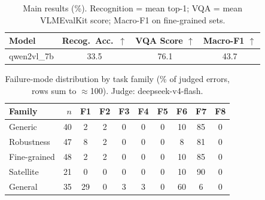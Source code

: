 \begin{table}[t]\centering
\caption{Main results (\%). Recognition = mean top-1; VQA = mean VLMEvalKit score; Macro-F1 on fine-grained sets.}\label{tab:main}
\begin{tabular}{lccc}\toprule
Model & Recog.\ Acc.\ $\uparrow$ & VQA Score $\uparrow$ & Macro-F1 $\uparrow$ \\\midrule
    qwen2vl_7b & 33.5 & 76.1 & 43.7 \\
\bottomrule\end{tabular}\end{table}

\begin{table}[t]\centering
\caption{Failure-mode distribution by task family (\% of judged errors, rows sum to $\approx$100). Judge: deepseek-v4-flash.}\label{tab:failure}
\begin{tabular}{lrcccccccc}\toprule
Family & $n$ & F1 & F2 & F3 & F4 & F5 & F6 & F7 & F8 \\\midrule
    Generic & 40 & 2 & 2 & 0 & 0 & 0 & 10 & 85 & 0 \\
    Robustness & 47 & 8 & 2 & 0 & 0 & 0 & 8 & 81 & 0 \\
    Fine-grained & 48 & 2 & 2 & 0 & 0 & 0 & 10 & 85 & 0 \\
    Satellite & 21 & 0 & 0 & 0 & 0 & 0 & 10 & 90 & 0 \\
    General & 35 & 29 & 0 & 3 & 3 & 0 & 60 & 6 & 0 \\
\bottomrule\end{tabular}\end{table}

